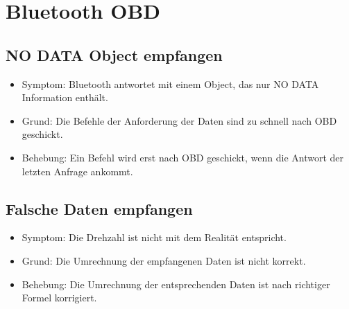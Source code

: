 \documentclass[qualitaetssicherung.tex]{subfiles}
\begin{document}
\section{Bluetooth OBD}

	\subsection{NO DATA Object empfangen}
		\begin{itemize}
			\item
			Symptom: Bluetooth antwortet mit einem Object, das nur NO DATA Information
			enthält.
			\item
			Grund: Die Befehle der Anforderung der Daten sind zu schnell nach OBD
			geschickt.
			\item
			Behebung: Ein Befehl wird erst nach OBD geschickt, wenn die Antwort der
			letzten Anfrage ankommt.
		\end{itemize}
		
	\subsection{Falsche Daten empfangen}
		\begin{itemize}
			\item
			Symptom: Die Drehzahl ist nicht mit dem Realität entspricht.
			\item
			Grund: Die Umrechnung der empfangenen Daten ist nicht korrekt.
			\item
			Behebung: Die Umrechnung der entsprechenden Daten ist nach richtiger Formel
			korrigiert.
		\end{itemize}
		
\end{document}
